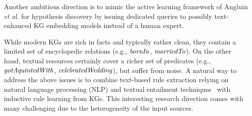 Another ambitious direction is to mimic the active learning framework of Angluin \emph{et al.} \cite{DBLP:journals/ml/Angluin87} for hypothesis discovery by issuing dedicated queries to possibly text-enhanced KG embedding models instead of a human expert.


  While modern KGs are rich in facts and typically rather clean, they contain a limited set of encyclopedic relations (e.g., $\mathit{bornIn}$, $\mathit{marriedTo}$). On the other hand, textual resources certainly cover a richer set of predicates (e.g., $\mathit{gotAquintedWith}$, $\mathit{celebratedWedding}$), but suffer from  noise. %
A natural way to address the %
above issues is to combine 
text-based rule extraction relying on natural language processing (NLP) and textual entailment techniques~\cite{Schoenmackers:2010,Gordon:2011,dragoni2016} with inductive rule learning from KGs. This interesting research direction comes with many challenging due to the heterogeneity of the input sources.


